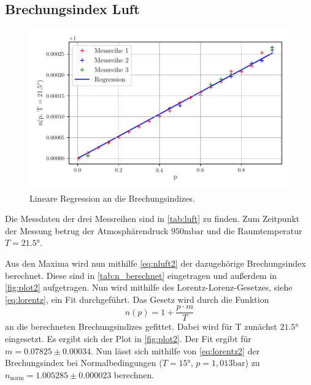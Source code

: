 \subsection{Brechungsindex Luft}
\begin{figure}
    \centering
    \includegraphics[width = 0.7 \linewidth]{build/Luft.pdf}
    \caption{Lineare Regression an die Brechungsindizes.}
    \label{fig:plot2}
\end{figure}
Die Messdaten der drei Messreihen sind in \autoref{tab:luft} zu finden.
Zum Zeitpunkt der Messung betrug der Atmosphärendruck $950 \unit{\milli\bar}$ und die Raumtemperatur $T = 21.5 \unit\degree$.


Aus den Maxima wird nun mithilfe \autoref{eq:nluft2} der dazugehörige Brechungsindex berechnet.
Diese sind in \autoref{tab:n_berechnet} eingetragen und außerdem in \autoref{fig:plot2} aufgetragen.
Nun wird mithilfe des Lorentz-Lorenz-Gesetzes, siehe \autoref{eq:lorentz}, ein Fit durchgeführt.
Das Gesetz wird durch die Funktion
\begin{equation} \label{eq:lorentz2}
    n(p) = 1 + \frac{p \cdot m}{T}
\end{equation}
an die berechneten Brechungsindizes gefittet. Dabei wird für T zunächst $21.5°$ eingesetzt.
Es ergibt sich der Plot in \autoref{fig:plot2}.
Der Fit ergibt für $m = 0.07825 \pm 0.00034$.
Nun lässt sich mithilfe von \autoref{eq:lorentz2} der Brechungsindex bei Normalbedingungen ($T = 15°$, $p = 1,013 \unit{\bar}$) zu $n_{\text{norm}} = 1.005285 \pm 0.000023$ berechnen.